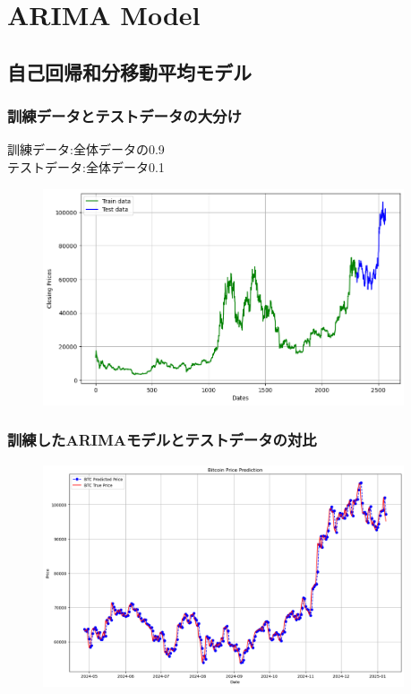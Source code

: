 \documentclass{beamer}  %
\begin{document}
\section{ARIMA Model}

\subsection{自己回帰和分移動平均モデル}

\begin{frame}
    \frametitle{訓練データとテストデータの大分け}
    訓練データ:全体データの0.9\\
    テストデータ:全体データ0.1
    \begin{figure}[h]
        \begin{center}
            \includegraphics[keepaspectratio, width=0.95\textwidth]{pic/ar0.png}\\
        \end{center}
    \end{figure}
\end{frame}

\begin{frame}
    \frametitle{訓練したARIMAモデルとテストデータの対比}
    \begin{figure}[h]
        \begin{center}
            \includegraphics[keepaspectratio, width=0.95\textwidth]{pic/ar1.png}\\
        \end{center}
    \end{figure}
\end{frame}
\end{document}
